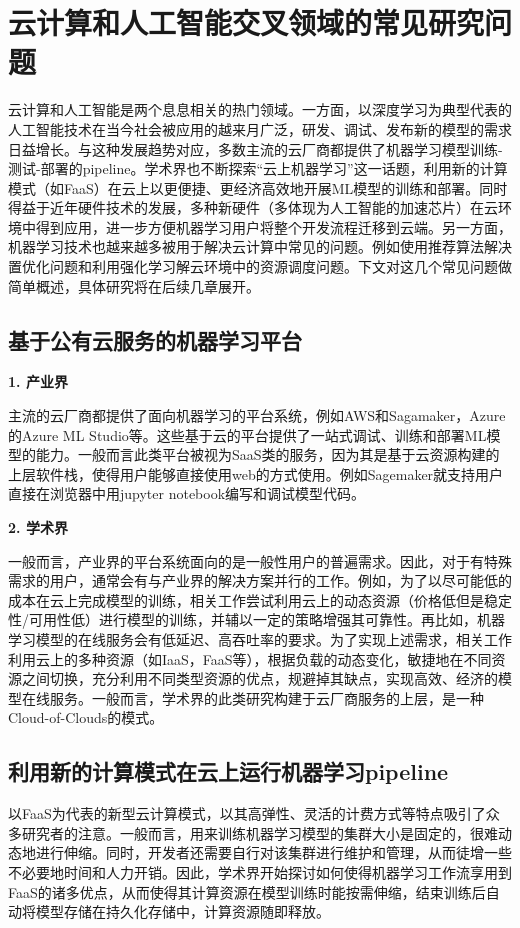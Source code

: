 \section{云计算和人工智能交叉领域的常见研究问题}
云计算和人工智能是两个息息相关的热门领域。一方面，以深度学习为典型代表的人工智能技术在当今社会被应用的越来月广泛，研发、调试、发布新的模型的需求日益增长。与这种发展趋势对应，多数主流的云厂商都提供了机器学习模型训练-测试-部署的pipeline。学术界也不断探索“云上机器学习”这一话题，利用新的计算模式（如FaaS）在云上以更便捷、更经济高效地开展ML模型的训练和部署。同时得益于近年硬件技术的发展，多种新硬件（多体现为人工智能的加速芯片）在云环境中得到应用，进一步方便机器学习用户将整个开发流程迁移到云端。另一方面，机器学习技术也越来越多被用于解决云计算中常见的问题。例如使用推荐算法解决置优化问题和利用强化学习解云环境中的资源调度问题。下文对这几个常见问题做简单概述，具体研究将在后续几章展开。

\subsection{基于公有云服务的机器学习平台}
\textbf{1. 产业界}

主流的云厂商都提供了面向机器学习的平台系统，例如AWS和Sagamaker\parencite{joshi2020amazon,liberty2020elastic,perrone2020amazon}，Azure的Azure ML Studio\parencite{etaati2019azure}等。这些基于云的平台提供了一站式调试、训练和部署ML模型的能力。一般而言此类平台被视为SaaS类的服务，因为其是基于云资源构建的上层软件栈，使得用户能够直接使用web的方式使用。例如Sagemaker就支持用户直接在浏览器中用jupyter notebook编写和调试模型代码。

\textbf{2. 学术界}

一般而言，产业界的平台系统面向的是一般性用户的普遍需求。因此，对于有特殊需求的用户，通常会有与产业界的解决方案并行的工作。例如，为了以尽可能低的成本在云上完成模型的训练，相关工作\parencite{harlap2017proteus,li2020spottune}尝试利用云上的动态资源（价格低但是稳定性/可用性低）进行模型的训练，并辅以一定的策略增强其可靠性。再比如，机器学习模型的在线服务会有低延迟、高吞吐率的要求。为了实现上述需求，相关工作\parencite{zhang2019mark}利用云上的多种资源（如IaaS，FaaS等），根据负载的动态变化，敏捷地在不同资源之间切换，充分利用不同类型资源的优点，规避掉其缺点，实现高效、经济的模型在线服务。一般而言，学术界的此类研究构建于云厂商服务的上层，是一种Cloud-of-Clouds的模式。

\subsection{利用新的计算模式在云上运行机器学习pipeline}
以FaaS为代表的新型云计算模式，以其高弹性、灵活的计费方式等特点吸引了众多研究者的注意。一般而言，用来训练机器学习模型的集群大小是固定的，很难动态地进行伸缩。同时，开发者还需要自行对该集群进行维护和管理，从而徒增一些不必要地时间和人力开销。因此，学术界开始探讨如何使得机器学习工作流享用到FaaS的诸多优点\parencite{wang2019distributed}，从而使得其计算资源在模型训练时能按需伸缩，结束训练后自动将模型存储在持久化存储中，计算资源随即释放。

